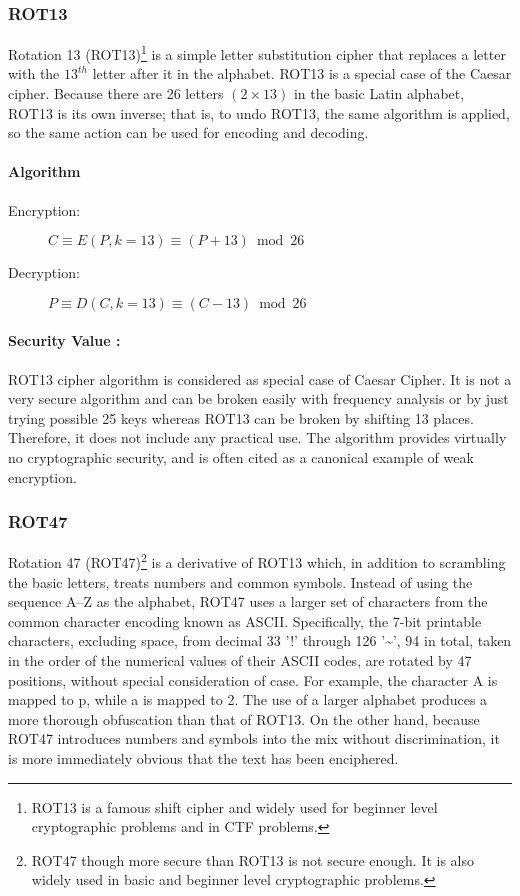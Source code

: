 \documentclass[british]{article}
\begin{document}
\subsubsection{ROT13}

Rotation 13 (ROT13)\footnote{ROT13 is a famous shift cipher and widely used for beginner level
cryptographic problems and in CTF problems.} is a simple letter substitution cipher that replaces a letter with
the $13^{th}$ letter after it in the alphabet. ROT13 is a special
case of the Caesar cipher. Because there are 26 letters $(2\times13)$
in the basic Latin alphabet, ROT13 is its own inverse; that is, to
undo ROT13, the same algorithm is applied, so the same action can
be used for encoding and decoding.

\paragraph{Algorithm}
\begin{description}
\item [{Encryption:}] $C\equiv E(P,k=13)\equiv(P+13)\bmod26$ 
\item [{Decryption:}] $P\equiv D(C,k=13)\equiv(C-13)\bmod26$ 
\end{description}

\paragraph{Security Value : }

ROT13 cipher algorithm is considered as special case of Caesar Cipher.
It is not a very secure algorithm and can be broken easily with frequency
analysis or by just trying possible 25 keys whereas ROT13 can be broken
by shifting 13 places. Therefore, it does not include any practical
use. The algorithm provides virtually no cryptographic security, and
is often cited as a canonical example of weak encryption.

\subsubsection{ROT47}

Rotation 47 (ROT47)\footnote{ROT47 though more secure than ROT13 is not secure enough. It is also
widely used in basic and beginner level cryptographic problems.} is a derivative of ROT13 which, in addition to scrambling the basic
letters, treats numbers and common symbols. Instead of using the sequence
A--Z as the alphabet, ROT47 uses a larger set of characters from
the common character encoding known as ASCII. Specifically, the 7-bit
printable characters, excluding space, from decimal 33 '!' through
126 '\textasciitilde ', 94 in total, taken in the order of the numerical
values of their ASCII codes, are rotated by 47 positions, without
special consideration of case. For example, the character A is mapped
to p, while a is mapped to 2. The use of a larger alphabet produces
a more thorough obfuscation than that of ROT13. On the other hand,
because ROT47 introduces numbers and symbols into the mix without
discrimination, it is more immediately obvious that the text has been
enciphered.
\end{document}
